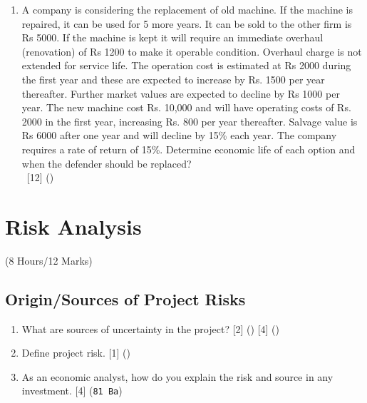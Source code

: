 \documentclass[12pt]{article}
\newcommand{\enter}{\\\textcolor{white}{1}}
\begin{document}
\begin{enumerate}
				\item A company is considering the replacement of old machine. If the machine is repaired, it can be used for 5 more years. It can be sold to the other firm is Rs 5000. If the machine is kept it will require an immediate overhaul (renovation) of Rs 1200 to make it operable condition. Overhaul charge is not extended for service life. The operation cost is estimated at Rs 2000 during the first year and these are expected to increase by Rs. 1500 per year thereafter. Further market values are expected to decline by Rs 1000 per year. The new machine cost Rs. 10,000 and will have operating costs of Rs. 2000 in the first year, increasing Rs. 800 per year thereafter. Salvage value is Rs 6000 after one year and will decline by 15\% each year. The company requires a rate of return of 15\%. Determine economic life of each option and when the defender should be replaced?
				\enter\hfill [12] ()
			\end{enumerate}

	\pagebreak
\section{Risk Analysis}
	\begin{center}(8 Hours/12 Marks)\end{center}
	\subsection{Origin/Sources of Project Risks}
		\begin{enumerate}[noitemsep, topsep=0pt]
			\item What are sources of uncertainty in the project? \hfill [2] () [4] ()

			\item Define project risk. \hfill [1] ()

			\item As an economic analyst, how do you explain the risk and source in any investment. \hfill [4] (\texttt{81 Ba})
		\end{enumerate}
\end{document}
